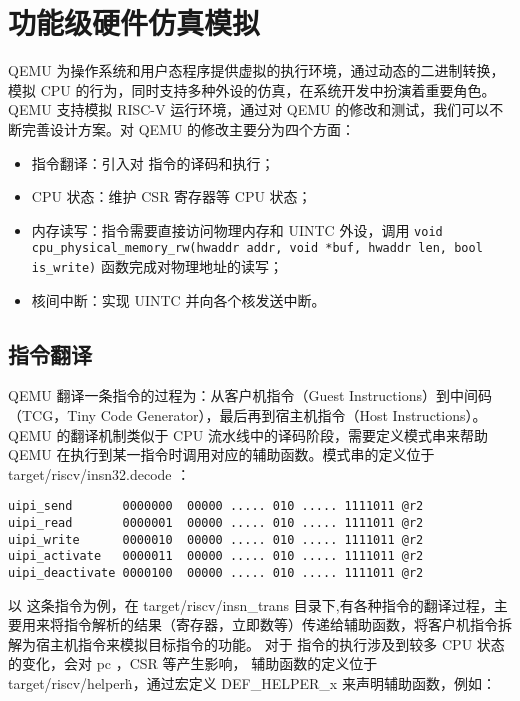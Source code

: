 
\chapter{功能级硬件仿真模拟}

QEMU \cite{qemu} 为操作系统和用户态程序提供虚拟的执行环境，通过动态的二进制转换，模拟 CPU 的行为，同时支持多种外设的仿真，在系统开发中扮演着重要角色。
QEMU 支持模拟 RISC-V 运行环境，通过对 QEMU 的修改和测试，我们可以不断完善设计方案。对 QEMU 的修改主要分为四个方面：

\begin{itemize}
    \item 指令翻译：引入对 \Iuipi 指令的译码和执行；
    \item CPU 状态：维护 CSR 寄存器等 CPU 状态；
    \item 内存读写：\Iuipi 指令需要直接访问物理内存和 UINTC 外设，调用 \texttt{void cpu_physical_memory_rw(hwaddr addr, void *buf, hwaddr len, bool is_write)} 函数完成对物理地址的读写；
    \item 核间中断：实现 UINTC 并向各个核发送中断。
\end{itemize}

\section{指令翻译}

QEMU 翻译一条指令的过程为：从客户机指令（Guest Instructions）到中间码（TCG，Tiny Code Generator），最后再到宿主机指令（Host Instructions）。
QEMU 的翻译机制类似于 CPU 流水线中的译码阶段，需要定义模式串来帮助 QEMU 在执行到某一指令时调用对应的辅助函数。模式串的定义位于 target/riscv/insn32.decode ：

\begin{lstlisting}
uipi_send       0000000  00000 ..... 010 ..... 1111011 @r2
uipi_read       0000001  00000 ..... 010 ..... 1111011 @r2
uipi_write      0000010  00000 ..... 010 ..... 1111011 @r2
uipi_activate   0000011  00000 ..... 010 ..... 1111011 @r2
uipi_deactivate 0000100  00000 ..... 010 ..... 1111011 @r2
\end{lstlisting}

以 \Iuret 这条指令为例，在 target/riscv/insn\_trans 目录下,有各种指令的翻译过程，主要用来将指令解析的结果（寄存器，立即数等）传递给辅助函数，将客户机指令拆解为宿主机指令来模拟目标指令的功能。
对于 \Iuret 指令的执行涉及到较多 CPU 状态的变化，会对 pc ，CSR 等产生影响， 辅助函数的定义位于 target/riscv/helper\.h，通过宏定义 DEF\_HELPER\_x 来声明辅助函数，例如：

